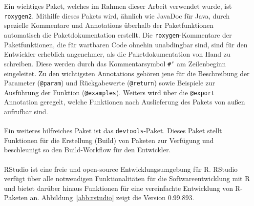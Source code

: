 \\
\\
Ein wichtiges Paket, welches im Rahmen dieser Arbeit verwendet wurde, ist \texttt{roxygen2}. Mithilfe dieses Pakets wird, ähnlich wie JavaDoc für Java, durch spezielle Kommentare und Annotations überhalb der Paketfunktionen automatisch die Paketdokumentation erstellt. Die \texttt{roxygen}-Kommentare der Paketfunktionen, die für wartbaren Code ohnehin unabdingbar sind, sind für den Entwickler erheblich angenehmer, als die Paketdokumentation von Hand zu schreiben. Diese werden durch das Kommentarsymbol \mbox{\texttt{\#'}} am Zeilenbeginn eingeleitet. Zu den wichtigsten Annotations gehören jene für die Beschreibung der Parameter (\texttt{@param}) und Rückgabewerte (\texttt{@return}) sowie Beispiele zur Ausführung der Funktion (\texttt{@examples}). Weiters wird über die \texttt{@export} Annotation geregelt, welche Funktionen nach Auslieferung des Pakets von außen aufrufbar sind.
\\
\\
Ein weiteres hilfreiches Paket ist das \texttt{devtools}-Paket. Dieses Paket stellt Funktionen für die Erstellung (Build) von Paketen zur Verfügung und beschleunigt so den Build-Workflow für den Entwickler.
\\
\\
RStudio ist eine freie und open-source Entwicklungsumgebung für R. RStudio verfügt über alle notwendigen Funktionalitäten für die Softwareentwicklung mit R und bietet darüber hinaus Funktionen für eine vereinfachte Entwicklung von R-Paketen an. Abbildung~\ref{abb:rstudio} zeigt die Version 0.99.893. 
